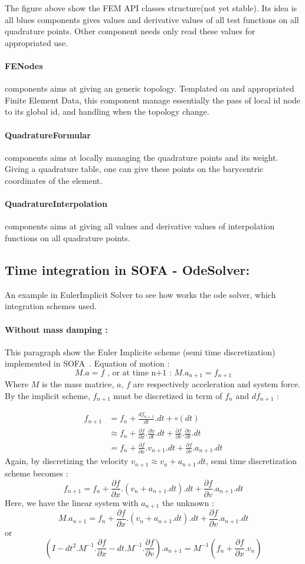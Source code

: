 \documentclass[a4paper,10pt]{article}
\begin{document}
The figure above show the FEM API classes structure(not yet stable). Its idea is all blues components gives values and derivative values of all test functions on all quadrature points. Other component needs only read these values for appropriated use.    
\paragraph{FENodes }components aims at giving an generic topology. Templated on and appropriated Finite Element Data, this component manage essentially the pass of local id node to its global id, and handling when the topology change. 
\paragraph{QuadratureFormular }components aims at locally managing the quadrature points and its weight. Giving a quadrature table, one can give these points on the barycentric coordinates of the element. 
\paragraph{QuadratureInterpolation }components aims at giving all values and derivative values of interpolation functions on all quadrature points.

\subsection{Time integration in SOFA - OdeSolver: }
An example in EulerImplicit Solver to see how works the ode solver, which integration schemes used. 
\paragraph{Without mass damping :} This paragraph show the Euler Implicite scheme (semi time discretization) implemented in SOFA~\cite{SofaODERef}. Equation of motion :
 \[
M.a=f \text{    ,  or at time n+1 :   }M.a_{n+1}=f_{n+1}
\]
Where $M$ is the mass matrice, $a$, $f$ are respectively acceleration and system force. By the implicit scheme, $f_{n+1}$ must be discretized in term of $f_{n}$ and $df_{n+1}$ :


\[
\begin{array}{rl}
f_{n+1} &       = f_n + \frac{ df_{n+1} }{dt}.dt + \circ(dt) \\
        & \approx f_n + \frac{\partial f}{\partial x}.\frac{\partial x}{\partial t}.dt + \frac{\partial f}{\partial v}.\frac{\partial v}{\partial t}.dt  \\
        &       = f_n + \frac{\partial f}{\partial x}.v_{n+1}.dt + \frac{\partial f}{\partial v}.a_{n+1}.dt  
\end{array}
\]
Again, by discretizing the velocity $v_{n+1} \approx v_{n}+a_{n+1}.dt$, semi time discretization scheme becomes :
\[
f_{n+1} = f_n + \frac{\partial f}{\partial x}.(v_{n}+a_{n+1}.dt).dt + \frac{\partial f}{\partial v}.a_{n+1}.dt  
\]
Here, we have the linear system with $a_{n+1}$ the unknown : 
\[
M.a_{n+1} = f_n + \frac{\partial f}{\partial x}.(v_{n}+a_{n+1}.dt).dt + \frac{\partial f}{\partial v}.a_{n+1}.dt  
\]
or
\[
(I - dt^2.M^{-1}.\frac{\partial f}{\partial x} - dt.M^{-1}.\frac{\partial f}{\partial v}).a_{n+1}= M^{-1}(f_n + \frac{\partial f}{\partial x}.v_n)
\]
\end{document}
